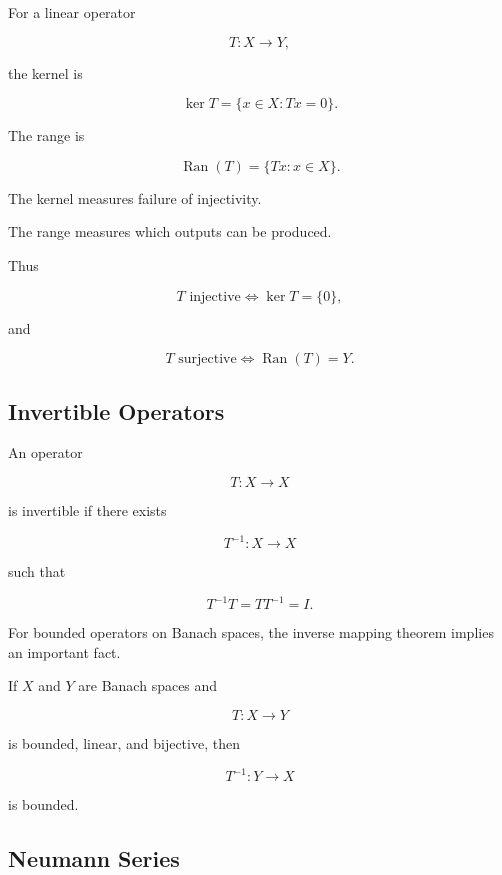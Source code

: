 For a linear operator

\[
T:X\to Y,
\]

the kernel is

\[
\boxed{
\ker T
=
\{x\in X:Tx=0\}.
}
\]

The range is

\[
\boxed{
\operatorname{Ran}(T)
=
\{Tx:x\in X\}.
}
\]

The kernel measures failure of injectivity.

The range measures which outputs can be produced.

Thus

\[
\boxed{
T\text{ injective}
\iff
\ker T=\{0\},
}
\]

and

\[
\boxed{
T\text{ surjective}
\iff
\operatorname{Ran}(T)=Y.
}
\]

\subsection{Invertible Operators}
\label{subsec:invertible-operators}

An operator

\[
T:X\to X
\]

is invertible if there exists

\[
T^{-1}:X\to X
\]

such that

\[
\boxed{
T^{-1}T
=
TT^{-1}
=
I.
}
\]

For bounded operators on Banach spaces, the inverse mapping theorem
implies an important fact.

\begin{theorem}
If \(X\) and \(Y\) are Banach spaces and

\[
T:X\to Y
\]

is bounded, linear, and bijective, then

\[
\boxed{
T^{-1}:Y\to X
}
\]

is bounded.
\end{theorem}

\subsection{Neumann Series}
\label{subsec:neumann-series}

